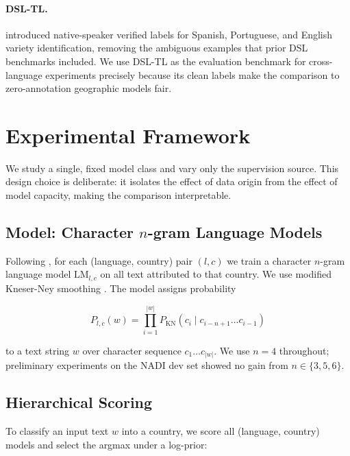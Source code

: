 \documentclass[11pt]{article}
\begin{document}
\paragraph{DSL-TL.}
\citet{haapanen-etal-2023-dsltl} introduced native-speaker verified labels
for Spanish, Portuguese, and English variety identification, removing the
ambiguous examples that prior DSL benchmarks included.  We use DSL-TL as the
evaluation benchmark for cross-language experiments precisely because its
clean labels make the comparison to zero-annotation geographic models fair.

\section{Experimental Framework}
\label{sec:method}

We study a single, fixed model class and vary only the supervision source.
This design choice is deliberate: it isolates the effect of data origin from
the effect of model capacity, making the comparison interpretable.

\subsection{Model: Character $n$-gram Language Models}
\label{sec:ngram}

Following \citet{salameh-etal-2018-fine}, for each (language, country) pair
$(l, c)$ we train a character $n$-gram language model $\text{LM}_{l,c}$ on
all text attributed to that country.  We use modified Kneser-Ney smoothing
\cite{kneser-ney-1995-improved, chen-goodman-1999-empirical}.
The model assigns probability

\begin{equation}
  P_{l,c}(w) = \prod_{i=1}^{|w|} P_{\text{KN}}(c_i \mid c_{i-n+1}\ldots c_{i-1})
\end{equation}

to a text string $w$ over character sequence $c_1 \ldots c_{|w|}$.  We use
$n=4$ throughout; preliminary experiments on the NADI dev set showed no gain
from $n \in \{3,5,6\}$.

\subsection{Hierarchical Scoring}
\label{sec:hierarchical}

To classify an input text $w$ into a country, we score all (language, country)
models and select the argmax under a log-prior:
\end{document}
